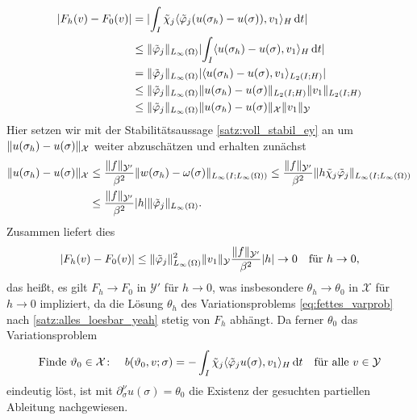 \begin{Satz}
\begin{Beweis}
\begin{align}
            \lvert F_{h}(v) - F_{0}(v)\rvert
            &= \lvert\int_{I} \tilde{\chi}_{j} \langle\tilde{\varphi}_{j}  (u(\sigma_{h}) - u(\sigma)),v_{1}\rangle_{H} \mathop{}\!\mathrm{d} t \rvert
            \\&\leq \lVert\tilde{\varphi}_{j}\rVert_{L_{\infty}(\Omega)} \lvert\int_{I} \langle u(\sigma_{h}) - u(\sigma),v_{1}\rangle_{H} \mathop{}\!\mathrm{d} t \rvert
            \\&= \lVert\tilde{\varphi}_{j}\rVert_{L_{\infty}(\Omega)} \lvert\langle u(\sigma_{h}) - u(\sigma),v_{1}\rangle_{L_{2}(I; H)} \rvert
            \\&\leq \lVert\tilde{\varphi}_{j}\rVert_{L_{\infty}(\Omega)} \lVert u(\sigma_{h}) - u(\sigma)\rVert_{L_{2}(I; H)} \lVert v_{1}\rVert_{L_{2}(I; H)}
            \\&\leq \lVert\tilde{\varphi}_{j}\rVert_{L_{\infty}(\Omega)} \lVert u(\sigma_{h}) - u(\sigma)\rVert_{\mathcal X} \lVert v_{1}\rVert_{\mathcal Y}
        \end{align}
        Hier setzen wir mit der Stabilitätsaussage \cref{satz:voll_stabil_ey} an um $\lVert u(\sigma_{h}) - u(\sigma)\rVert_{\mathcal X}$ weiter abzuschätzen und erhalten zunächst
        \begin{equation}
            \begin{aligned}
                \lVert u(\sigma_{h}) - u(\sigma)\rVert_{\mathcal X}
                &\leq \frac{\lVert f\rVert_{\mathcal Y'}}{\beta^{2}} \lVert w(\sigma_{h}) - \omega(\sigma)\rVert_{L_{\infty}(I; L_{\infty}(\Omega))}
                \leq \frac{\lVert f\rVert_{\mathcal Y'}}{\beta^{2}} \lVert h \tilde{\chi}_{j} \tilde{\varphi}_{j} \rVert_{L_{\infty}(I; L_{\infty}(\Omega))}
                \\&\leq \frac{\lVert f\rVert_{\mathcal Y'}}{\beta^{2}} \lvert h\rvert \lVert\tilde{\varphi}_{j}\rVert_{L_{\infty}(\Omega)}.
            \end{aligned}
        \end{equation}
        Zusammen liefert dies
        \begin{equation}
            \lvert F_{h}(v) - F_{0}(v)\rvert
            \leq \lVert\tilde{\varphi}_{j}\rVert^{2}_{L_{\infty}(\Omega)} \lVert v_{1}\rVert_{\mathcal Y} \frac{\lVert f\rVert_{\mathcal Y'}}{\beta^{2}} \lvert h\rvert \to 0 \quad \text{für}~h \to 0,
        \end{equation}
        das heißt, es gilt $F_{h} \to F_{0}$ in $\mathcal Y'$ für $h \to 0$,
        was insbesondere $\theta_{h} \to \theta_{0}$ in $\mathcal X$ für $h \to 0$ impliziert, da die Lösung $\theta_{h}$ des Variationsproblems \cref{eq:fettes_varprob} nach \cref{satz:alles_loesbar_yeah} stetig von $F_{h}$ abhängt.
        Da ferner $\theta_{0}$ das Variationsproblem
        \begin{equation}
            \label{eq:fette_abletung_jo}
            \text{Finde}~\theta_{0} \in \mathcal X \colon \quad b(\theta_{0}, v; \sigma) = - \int_{I} \tilde{\chi}_{j} \skp{\tilde{\varphi}_{j}  u(\sigma)}{v_{1}}{H} \diff t \quad \fa v \in \mathcal Y
        \end{equation}
        eindeutig löst, ist mit $\partial^{\nu}_{\sigma} u(\sigma) = \theta_{0}$ die Existenz der gesuchten partiellen Ableitung nachgewiesen.


\end{Beweis}
\end{Satz}
